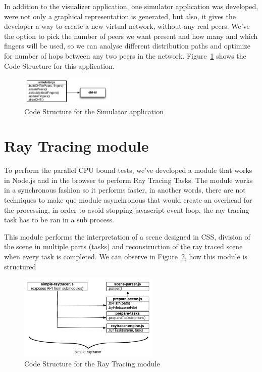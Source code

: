 In addition to the visualizer application, one simulator application was developed, were not only a graphical representation is generated, but also, it gives the developer a way to create a new virtual network, without any real peers. We've the option to pick the number of peers we want present and how many and which fingers will be used, so we can analyse different distribution paths and optimize for number of hops between any two peers in the network. Figure~\ref{fig:d-s} shows the Code Structure for this application.


\begin{figure}[h!]
  \centering
  \includegraphics[width=0.4\textwidth]{figs/diagram-simulator}
  \caption{Code Structure for the Simulator application}
  \label{fig:d-s}
\end{figure}

\section{Ray Tracing module}

To perform the parallel CPU bound tests, we've developed a module that works in Node.js and in the browser to perform Ray Tracing Tasks. The module works in a synchronous fashion so it performs faster, in another words, there are not techniques to make que module asynchronous that would create an overhead for the processing, in order to avoid stopping javascript event loop, the ray tracing task has to be ran in a sub process.

This module performs the interpretation of a scene designed in CSS, division of the scene in multiple parts (tasks) and reconstruction of the ray traced scene when every task is completed. We can observe in Figure~\ref{fig:d-s-r}, how this module is structured

\begin{figure}[h!]
  \centering
  \includegraphics[width=0.6\textwidth]{figs/diagram-simple-raytracer}
  \caption{Code Structure for the Ray Tracing module}
  \label{fig:d-s-r}
\end{figure}

